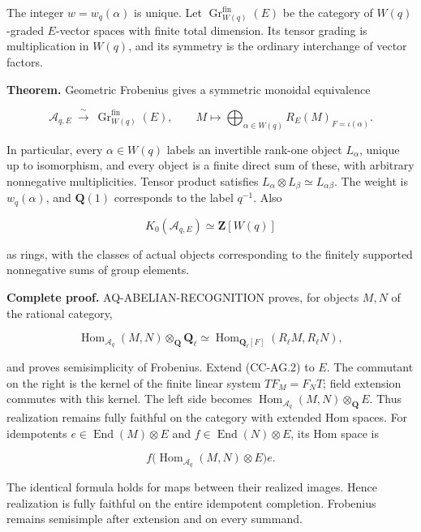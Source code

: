 The integer \(w=w_q(\alpha)\) is unique. Let
\(\operatorname{Gr}^{\mathrm{fin}}_{W(q)}(E)\) be the category of
\(W(q)\)-graded \(E\)-vector spaces with finite total dimension. Its
tensor grading is multiplication in \(W(q)\), and its symmetry is the
ordinary interchange of vector factors.

\textbf{Theorem.} Geometric Frobenius gives a symmetric monoidal
equivalence

\[
 \mathcal A_{q,E}\ \xrightarrow{\ \sim\ }\
 \operatorname{Gr}^{\mathrm{fin}}_{W(q)}(E),\qquad
 M\longmapsto
 \bigoplus_{\alpha\in W(q)}
 R_E(M)_{F=\iota(\alpha)}.                         \tag{CC-AG.1}
\]

In particular, every \(\alpha\in W(q)\) labels an invertible rank-one
object \(L_\alpha\), unique up to isomorphism, and every object is a
finite direct sum of these, with arbitrary nonnegative multiplicities.
Tensor product satisfies
\(L_\alpha\otimes L_\beta\simeq L_{\alpha\beta}\). The weight is
\(w_q(\alpha)\), and \(\mathbf Q(1)\) corresponds to the label
\(q^{-1}\). Also

\[
 K_0(\mathcal A_{q,E})\simeq\mathbf Z[W(q)]
\]

as rings, with the classes of actual objects corresponding to the
finitely supported nonnegative sums of group elements.

\textbf{Complete proof.} AQ-ABELIAN-RECOGNITION proves, for objects
\(M,N\) of the rational category,

\[
 \operatorname{Hom}_{\mathcal A_q}(M,N)
          \otimes_{\mathbf Q}\mathbf Q_\ell
 \simeq
 \operatorname{Hom}_{\mathbf Q_\ell[F]}
       (R_\ell M,R_\ell N),                       \tag{CC-AG.2}
\]

and proves semisimplicity of Frobenius. Extend (CC-AG.2) to \(E\). The
commutant on the right is the kernel of the finite linear system
\(TF_M=F_NT\); field extension commutes with this kernel. The left side
becomes \(\operatorname{Hom}_{\mathcal A_q}(M,N)\otimes_{\mathbf Q}E\).
Thus realization remains fully faithful on the category with extended
Hom spaces. For idempotents \(e\in\operatorname{End}(M)\otimes E\) and
\(f\in\operatorname{End}(N)\otimes E\), its Hom space is

\[
 f\bigl(\operatorname{Hom}_{\mathcal A_q}(M,N)\otimes E\bigr)e.
\]

The identical formula holds for maps between their realized images.
Hence realization is fully faithful on the entire idempotent completion.
Frobenius remains semisimple after extension and on every summand.

